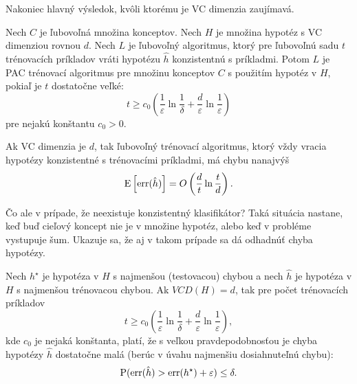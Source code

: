 \medskip

Nakoniec hlavný výsledok, kvôli ktorému je VC dimenzia zaujímavá.

\begin{theorem}
  Nech $C$ je ľubovoľná množina konceptov. Nech $H$ je množina hypotéz
  s VC dimenziou rovnou $d$. Nech $L$ je ľubovoľný algoritmus, ktorý
  pre ľubovoľnú sadu $t$ trénovacích príkladov vráti hypotézu $\hat{h}$
  konzistentnú s príkladmi. Potom $L$ je PAC trénovací algoritmus pre
  množinu konceptov $C$ s použitím hypotéz v $H$, pokiaľ je $t$
  dostatočne veľké:
  $$ t \geq c_0 \left( \frac{1}{\varepsilon} \ln{\frac{1}{\delta}} + \frac{d}{\varepsilon} \ln{\frac{1}{\varepsilon}} \right) $$
  pre nejakú konštantu $c_0 > 0$.
\end{theorem}


\begin{theorem}
  Ak VC dimenzia je $d$, tak ľubovoľný trénovací algoritmus, ktorý vždy
  vracia hypotézy konzistentné s trénovacími príkladmi, má chybu nanajvýš
  $$ \operatorname*{\mathrm{E}} \left[ \mathrm{err}(\hat{h}) \right] = O\left( \frac{d}{t} \ln{\frac{t}{d}} \right). $$
\end{theorem}


Čo ale v prípade, že neexistuje konzistentný klasifikátor? Taká situácia
nastane, keď buď cieľový koncept nie je v množine hypotéz, alebo keď v
probléme vystupuje šum. Ukazuje sa, že aj v takom prípade sa dá
odhadnúť chyba hypotézy.

\begin{theorem}
  Nech $h^\star$ je hypotéza v $H$ s najmenšou (testovacou) chybou a
  nech $\hat{h}$ je hypotéza v $H$ s najmenšou trénovacou chybou. Ak
  $VCD(H) = d$, tak pre počet trénovacích príkladov
  $$ t \geq c_0 \left( \frac{1}{\varepsilon} \ln{\frac{1}{\delta}} + \frac{d}{\varepsilon} \ln{\frac{1}{\varepsilon}} \right), $$
  kde $c_0$ je nejaká konštanta, platí, že s veľkou pravdepodobnosťou
  je chyba hypotézy $\hat{h}$ dostatočne malá (berúc v úvahu najmenšiu
  dosiahnuteľnú chybu):
  $$ \operatorname*{\mathrm{P}}( \mathrm{err}(\hat{h}) > \mathrm{err}(h^\star) + \varepsilon ) \leq \delta. $$
\end{theorem}

